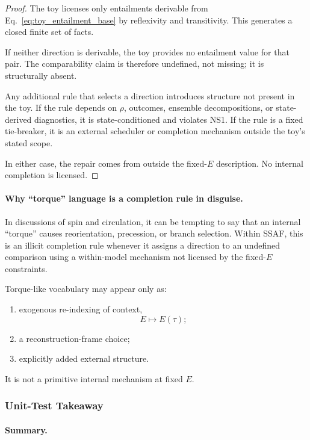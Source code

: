 \documentclass[aps,prx,onecolumn,11pt]{revtex4-2}
\theoremstyle{plain}
\theoremstyle{definition}
\theoremstyle{remark}
\begin{document}
\begin{proof}
The toy licenses only entailments derivable from
Eq.~\eqref{eq:toy_entailment_base} by reflexivity and transitivity.
This generates a closed finite set of facts.

If neither direction is derivable, the toy provides no entailment value
for that pair. The comparability claim is therefore undefined, not
missing; it is structurally absent.

Any additional rule that selects a direction introduces structure not
present in the toy. If the rule depends on \(\rho\), outcomes, ensemble
decompositions, or state-derived diagnostics, it is state-conditioned
and violates NS1. If the rule is a fixed tie-breaker, it is an external
scheduler or completion mechanism outside the toy's stated scope.

In either case, the repair comes from outside the fixed-\(E\)
description. No internal completion is licensed.
\end{proof}

\paragraph{Why ``torque'' language is a completion rule in disguise.}

In discussions of spin and circulation, it can be tempting to say that
an internal ``torque'' causes reorientation, precession, or branch
selection. Within SSAF, this is an illicit completion rule whenever it
assigns a direction to an undefined comparison using a within-model
mechanism not licensed by the fixed-\(E\) constraints.

Torque-like vocabulary may appear only as:
\begin{enumerate}[label=(\roman*), leftmargin=2.2em]
\item exogenous re-indexing of context,
\[
E\mapsto E(\tau);
\]
\item a reconstruction-frame choice;
\item explicitly added external structure.
\end{enumerate}

It is not a primitive internal mechanism at fixed \(E\).

\subsubsection{Unit-Test Takeaway}
\label{toy:admissibility_entailment:summary}

\paragraph{Summary.}
\end{document}

